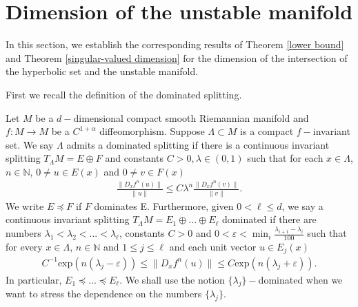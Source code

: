 \documentclass[11pt,a4paper]{amsart}
\theoremstyle{plain}
\newtheorem{Thm}{Theorem}[section]
\theoremstyle{remark}
\def\min{\operatorname{min}}
\begin{document}

	
	
	
	
	
	
	
	
	\iffalse
	\section{Dimension of the unstable manifold}
	In this section, we establish the corresponding results of Theorem \ref{lower bound} and Theorem \ref{singular-valued dimension} for the dimension of the intersection of the hyperbolic set and the unstable manifold.
	
	First we recall the definition of the dominated splitting.
	
	Let $M$ be a $d-$dimensional compact smooth Riemannian manifold and $f:M\rightarrow M$ be a $C^{1+\alpha}$ diffeomorphism. Suppose $\Lambda\subset M$ is a compact $f-$invariant set. We say $\Lambda$ admits a dominated splitting if there is a continuous invariant splitting $T_{\Lambda}M=E\oplus F$ and constants $C>0,\lambda\in (0,1)$ such that for each $x\in \Lambda$, $n\in \mathbb{N}$, $0\neq u\in E(x)$ and $0\neq v\in F(x)$
	\begin{align*}
		\frac{\|D_{x}f^{n}(u)\|}{\|u\|}\leq C\lambda^{n}\frac{\|D_{x}f^{n}(v)\|}{\|v\|}.
	\end{align*}
	We write $E\preceq F$ if $F$ dominates E. Furthermore, given $0<\ell\leq d$, we say a continuous invariant splitting $T_{\Lambda}M=E_{1}\oplus...\oplus E_{\ell}$ dominated if there are numbers $\lambda_{1}<\lambda_{2}<...<\lambda_{\ell}$, constants $C>0$ and $0<\varepsilon<\min_{i}\frac{\lambda_{i+1}-\lambda_{i}}{100}$ such that for every $x\in \Lambda$, $n\in\mathbb{N}$ and $1\leq j\leq \ell$ and each unit vector $u\in E_{j}(x)$
	\begin{align*}
		C^{-1}\text{exp}(n(\lambda_{j}-\varepsilon))\leq \|D_{x}f^{n}(u)\|\leq C \text{exp}(n(\lambda_{j}+\varepsilon)).
	\end{align*}
	In particular, $E_{1}\preceq...\preceq E_{\ell}$. We shall use the notion $\{\lambda_{j}\}-$dominated when we want to stress the dependence on the numbers $\{\lambda_{j}\}$.
	
\end{document}
